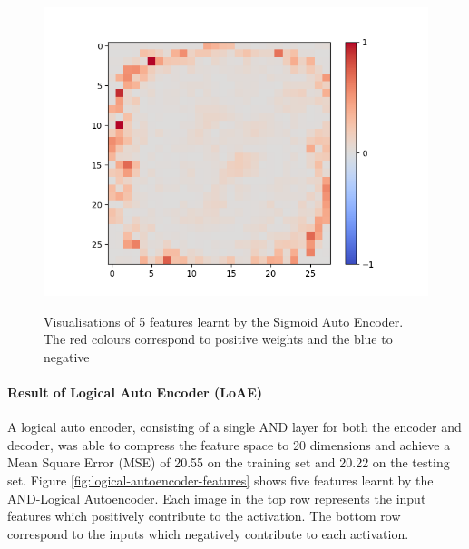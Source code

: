 \begin{figure}[H]
\begin{minipage}[b]{0.19\textwidth}
		\includegraphics[width=\textwidth]{SAE(20LF)/Feature-15.png}
		\label{}
	\end{minipage}
	\caption{Visualisations of 5 features learnt by the Sigmoid Auto Encoder. The red colours correspond to positive weights and the blue to negative}
	\label{fig:sigmoid-autoencoder-features}
	\hfill
\end{figure}

\paragraph{Result of Logical Auto Encoder (LoAE)}
A logical auto encoder, consisting of a single AND layer for both the encoder and decoder, was able to compress the feature space to 20 dimensions and achieve a Mean Square Error (MSE) of 20.55 on the training set and 20.22 on the testing set. Figure \ref{fig:logical-autoencoder-features} shows five features learnt by the AND-Logical Autoencoder. Each image in the top row represents the input features which positively contribute to the activation. The bottom row correspond to the inputs which negatively contribute to each activation. 

